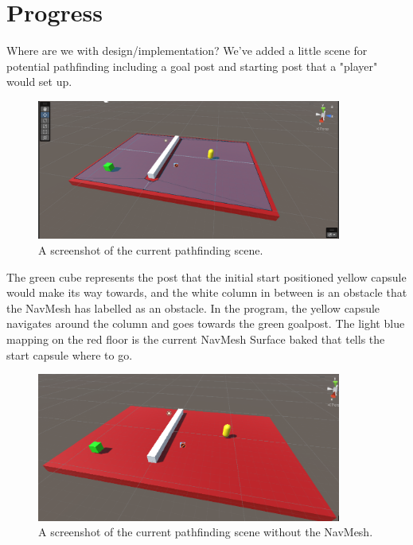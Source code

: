 \section{Progress}

Where are we with design/implementation?
We've added a little scene for potential pathfinding including a goal post and starting post that a "player" would set up. 

\begin{figure}[htb]
    \centering
    \includegraphics[width=10cm]{../Images/Update2/PathFind.png}
       \caption{A screenshot of the current pathfinding scene.}
           \label{Fig:PathfindingScene}
  \end{figure}

\begin{flushleft}
The green cube represents the post that the initial start positioned yellow capsule would make its way towards, and the white column in between is an obstacle that the NavMesh has labelled as an obstacle. In the program, the yellow capsule navigates around the column and goes towards the green goalpost. The light blue mapping on the red floor is the current NavMesh Surface baked that tells the start capsule where to go.
\end{flushleft}

\begin{figure}[!ht]
    \centering
    \includegraphics[width=10cm]{../Images/Update2/NoNavMesh.png}
       \caption{A screenshot of the current pathfinding scene without the NavMesh.}
           \label{Fig:NoNavMesh}
   \end{figure}

